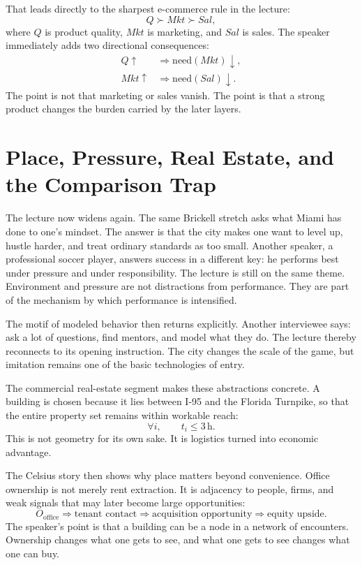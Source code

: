 That leads directly to the sharpest e-commerce rule in the lecture:
\begin{equation}
Q \succ Mkt \succ Sal,
\end{equation}
where $Q$ is product quality, $Mkt$ is marketing, and $Sal$ is sales. The speaker immediately adds two directional consequences:
\begin{align}
Q \uparrow &\Rightarrow \text{need}(Mkt)\downarrow,\\
Mkt \uparrow &\Rightarrow \text{need}(Sal)\downarrow.
\end{align}
The point is not that marketing or sales vanish. The point is that a strong product changes the burden carried by the later layers.

\section{Place, Pressure, Real Estate, and the Comparison Trap}

The lecture now widens again. The same Brickell stretch asks what Miami has done to one's mindset. The answer is that the city makes one want to level up, hustle harder, and treat ordinary standards as too small. Another speaker, a professional soccer player, answers success in a different key: he performs best under pressure and under responsibility. The lecture is still on the same theme. Environment and pressure are not distractions from performance. They are part of the mechanism by which performance is intensified.

The motif of modeled behavior then returns explicitly. Another interviewee says: ask a lot of questions, find mentors, and model what they do. The lecture thereby reconnects to its opening instruction. The city changes the scale of the game, but imitation remains one of the basic technologies of entry.

The commercial real-estate segment makes these abstractions concrete. A building is chosen because it lies between I-95 and the Florida Turnpike, so that the entire property set remains within workable reach:
\begin{equation}
\forall i,\qquad t_i \le 3\,\mathrm{h}.
\end{equation}
This is not geometry for its own sake. It is logistics turned into economic advantage.

The Celsius story then shows why place matters beyond convenience. Office ownership is not merely rent extraction. It is adjacency to people, firms, and weak signals that may later become large opportunities:
\begin{equation}
O_{\mathrm{office}} \Rightarrow \text{tenant contact} \Rightarrow \text{acquisition opportunity} \Rightarrow \text{equity upside}.
\end{equation}
The speaker's point is that a building can be a node in a network of encounters. Ownership changes what one gets to see, and what one gets to see changes what one can buy.

